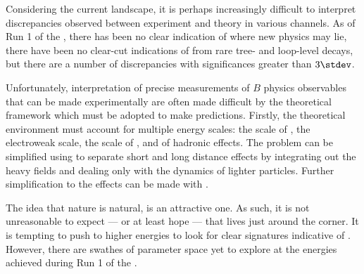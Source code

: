 Considering the current landscape, it is perhaps increasingly difficult to interpret
discrepancies observed between experiment and theory in various channels.
As of Run 1 of the \lhc, there has been no clear indication of where new physics may lie, there
have been no clear-cut indications of \np from rare tree- and loop-level decays, but there are a
number of discrepancies with significances greater than $3\stdev$.


Unfortunately, interpretation of precise measurements of $B$ physics observables that can be made
experimentally are often made difficult by the theoretical framework which must be adopted to make
predictions.
Firstly, the theoretical environment must account for multiple energy scales: the scale of \np, the
electroweak scale, the scale of \QCD, and of hadronic effects.
The problem can be simplified using \EFT to separate short and long distance effects by integrating
out the heavy fields and dealing only with the dynamics of lighter particles.
Further simplification to the \QCD effects can be made with \HQET.

The idea that nature is natural, is an attractive one.
As such, it is not unreasonable to expect --- or at least hope --- that \np lives just
around the corner.
It is tempting to push to higher energies to look for clear signatures indicative of \np.
However, there are swathes of parameter space yet to explore at the energies achieved during Run 1
of the \lhc.



